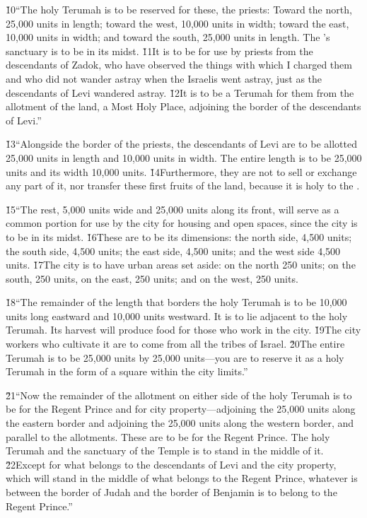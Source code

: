 \v{10}``The holy Terumah is to be reserved for these, the priests: Toward the north, 25,000 units in length; toward the west, 10,000 units in width; toward the east, 10,000 units in width; and toward the south, 25,000 units in length. The 's sanctuary is to be in its midst. \v{11}It is to be for use by priests from the descendants of Zadok, who have observed the things with which I charged them and who did not wander astray when the Israelis went astray, just as the descendants of Levi wandered astray. \v{12}It is to be a Terumah for them from the allotment of the land, a Most Holy Place, adjoining the border of the descendants of Levi.''

\v{13}``Alongside the border of the priests, the descendants of Levi are to be allotted 25,000 units in length and 10,000 units in width. The entire length is to be 25,000 units and its width 10,000 units. \v{14}Furthermore, they are not to sell or exchange any part of it, nor transfer these first fruits of the land, because it is holy to the .

\v{15}``The rest, 5,000 units wide and 25,000 units along its front, will serve as a common portion for use by the city for housing and open spaces, since the city is to be in its midst. \v{16}These are to be its dimensions: the north side, 4,500 units; the south side, 4,500 units; the east side, 4,500 units; and the west side 4,500 units. \v{17}The city is to have urban areas set aside: on the north 250 units; on the south, 250 units, on the east, 250 units; and on the west, 250 units.

\v{18}``The remainder of the length that borders the holy Terumah is to be 10,000 units long eastward and 10,000 units westward. It is to lie adjacent to the holy Terumah. Its harvest will produce food for those who work in the city. \v{19}The city workers who cultivate it are to come from all the tribes of Israel. \v{20}The entire Terumah is to be 25,000 units by 25,000 units---you are to reserve it as a holy Terumah in the form of a square within the city limits.''

\v{21}``Now the remainder of the allotment on either side of the holy Terumah is to be for the Regent Prince and for city property---adjoining the 25,000 units along the eastern border and adjoining the 25,000 units along the western border, and parallel to the allotments. These are to be for the Regent Prince. The holy Terumah and the sanctuary of the Temple is to stand in the middle of it. \v{22}Except for what belongs to the descendants of Levi and the city property, which will stand in the middle of what belongs to the Regent Prince, whatever is between the border of Judah and the border of Benjamin is to belong to the Regent Prince.''

